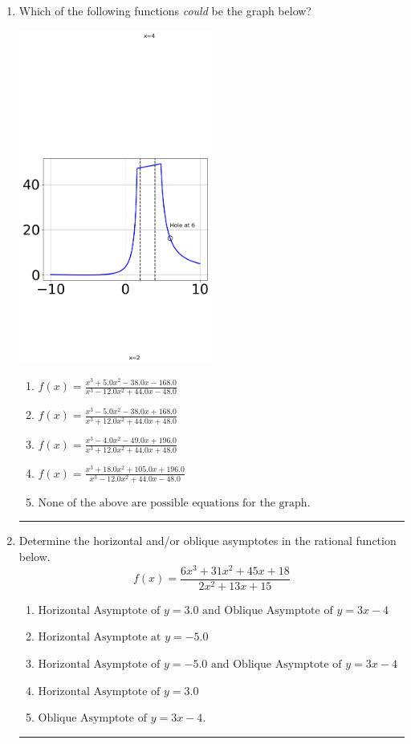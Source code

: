 \documentclass[14pt]{extbook}
\newcommand{\litem}[1]{\item#1\hspace*{-1cm}\rule{\textwidth}{0.4pt}}
\begin{document}
\begin{enumerate}
{\begin{enumerate}[label=\Alph*.]
\end{enumerate} }
\litem{
Which of the following functions \textit{could} be the graph below?
\begin{center}
    \includegraphics[width=0.5\textwidth]{../Figures/identifyGraphOfRationalFunctionA.png}
\end{center}
\begin{enumerate}[label=\Alph*.]
\item \( f(x)=\frac{x^{3} +5.0 x^{2} -38.0 x -168.0}{x^{3} -12.0 x^{2} +44.0 x -48.0} \)
\item \( f(x)=\frac{x^{3} -5.0 x^{2} -38.0 x + 168.0}{x^{3} +12.0 x^{2} +44.0 x + 48.0} \)
\item \( f(x)=\frac{x^{3} -4.0 x^{2} -49.0 x + 196.0}{x^{3} +12.0 x^{2} +44.0 x + 48.0} \)
\item \( f(x)=\frac{x^{3} +18.0 x^{2} +105.0 x + 196.0}{x^{3} -12.0 x^{2} +44.0 x -48.0} \)
\item \( \text{None of the above are possible equations for the graph.} \)

\end{enumerate} }
\litem{
Determine the horizontal and/or oblique asymptotes in the rational function below.\[ f(x) = \frac{6x^{3} +31 x^{2} +45 x + 18}{2x^{2} +13 x + 15} \]\begin{enumerate}[label=\Alph*.]
\item \( \text{Horizontal Asymptote of } y = 3.0 \text{ and Oblique Asymptote of } y = 3x -4 \)
\item \( \text{Horizontal Asymptote at } y = -5.0 \)
\item \( \text{Horizontal Asymptote of } y = -5.0 \text{ and Oblique Asymptote of } y = 3x -4 \)
\item \( \text{Horizontal Asymptote of } y = 3.0  \)
\item \( \text{Oblique Asymptote of } y = 3x -4. \)


\end{enumerate}}
\end{enumerate}
\end{document}
